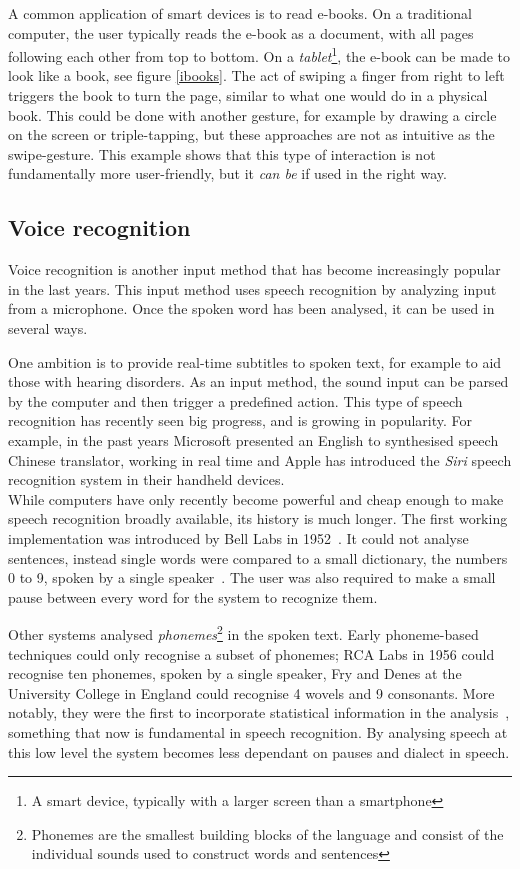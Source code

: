 A common application of smart devices is to read e-books. On a traditional computer, the user typically reads the e-book as a document, with all pages following each other from top to bottom. On a \emph{tablet}\footnote{A smart device, typically with a larger screen than a smartphone}, the e-book can be made to look like a book, see figure \ref{ibooks}. The act of swiping a finger from right to left triggers the book to turn the page, similar to what one would do in a physical book. This could be done with another gesture, for example by drawing a circle on the screen or triple-tapping, but these approaches are not as intuitive as the swipe-gesture. This example shows that this type of interaction is not fundamentally more user-friendly, but it \emph{can be} if used in the right way. 

\subsection{Voice recognition}

Voice recognition is another input method that has become increasingly popular in the last years. This input method uses speech recognition by analyzing input from a microphone. Once the spoken word has been analysed, it can be used in several ways.

One ambition is to provide real-time subtitles to spoken text, for example to aid those with hearing disorders. As an input method, the sound input can be parsed by the computer and then trigger a predefined action. This type of speech recognition has recently seen big progress, and is growing in popularity. For example, in the past years Microsoft presented an English to synthesised speech Chinese translator, working in real time and Apple has introduced the \emph{Siri} speech recognition system in their handheld devices.\\

While computers have only recently become powerful and cheap enough to make speech recognition broadly available, its history is much longer. The first working implementation was introduced by Bell Labs in 1952~\cite{Davis52}. It could not analyse sentences, instead single words were compared to a small dictionary, the numbers 0 to 9, spoken by a single speaker~\cite{juang}. The user was also required to make a small pause between every word for the system to recognize them.

Other systems analysed \emph{phonemes}\footnote{Phonemes are the smallest building blocks of the language and consist of the individual sounds used to construct words and sentences} in the spoken text. Early phoneme-based techniques could only recognise a subset of phonemes; RCA Labs in 1956 could recognise ten phonemes, spoken by a single speaker, Fry and Denes at the University College in England could recognise 4 wovels and 9 consonants. More notably, they were the first to incorporate statistical information in the analysis~\cite{juang}, something that now is fundamental in speech recognition. By analysing speech at this low level the system becomes less dependant on pauses and dialect in speech.

